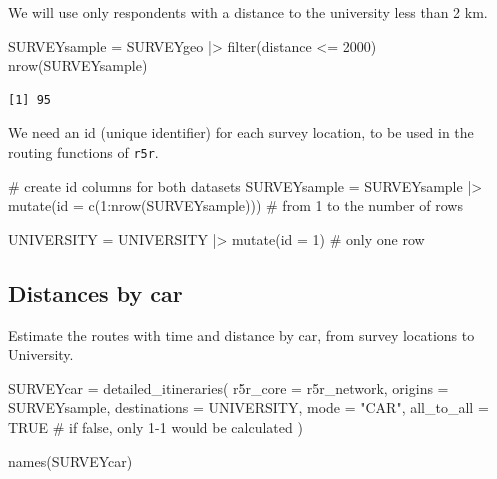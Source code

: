 \documentclass[
  letterpaper,
  DIV=11,
  numbers=noendperiod]{scrreprt}
\newenvironment{Shaded}{\begin{snugshade}}{\end{snugshade}}
\newcommand{\AttributeTok}[1]{\textcolor[rgb]{0.40,0.45,0.13}{#1}}
\newcommand{\CommentTok}[1]{\textcolor[rgb]{0.37,0.37,0.37}{#1}}
\newcommand{\ConstantTok}[1]{\textcolor[rgb]{0.56,0.35,0.01}{#1}}
\newcommand{\DecValTok}[1]{\textcolor[rgb]{0.68,0.00,0.00}{#1}}
\newcommand{\FunctionTok}[1]{\textcolor[rgb]{0.28,0.35,0.67}{#1}}
\newcommand{\NormalTok}[1]{\textcolor[rgb]{0.00,0.23,0.31}{#1}}
\newcommand{\OtherTok}[1]{\textcolor[rgb]{0.00,0.23,0.31}{#1}}
\newcommand{\SpecialCharTok}[1]{\textcolor[rgb]{0.37,0.37,0.37}{#1}}
\newcommand{\StringTok}[1]{\textcolor[rgb]{0.13,0.47,0.30}{#1}}
\begin{document}
We will use only respondents with a distance to the university less than
2 km.

\begin{Shaded}
\begin{Highlighting}[]
\NormalTok{SURVEYsample }\OtherTok{=}\NormalTok{ SURVEYgeo }\SpecialCharTok{|\textgreater{}} \FunctionTok{filter}\NormalTok{(distance }\SpecialCharTok{\textless{}=} \DecValTok{2000}\NormalTok{)}
\FunctionTok{nrow}\NormalTok{(SURVEYsample)}
\end{Highlighting}
\end{Shaded}

\begin{verbatim}
[1] 95
\end{verbatim}

We need an id (unique identifier) for each survey location, to be used
in the routing functions of \texttt{r5r}.

\begin{Shaded}
\begin{Highlighting}[]
\CommentTok{\# create id columns for both datasets}
\NormalTok{SURVEYsample }\OtherTok{=}\NormalTok{ SURVEYsample }\SpecialCharTok{|\textgreater{}} 
  \FunctionTok{mutate}\NormalTok{(}\AttributeTok{id =} \FunctionTok{c}\NormalTok{(}\DecValTok{1}\SpecialCharTok{:}\FunctionTok{nrow}\NormalTok{(SURVEYsample))) }\CommentTok{\# from 1 to the number of rows}

\NormalTok{UNIVERSITY }\OtherTok{=}\NormalTok{ UNIVERSITY }\SpecialCharTok{|\textgreater{}} 
  \FunctionTok{mutate}\NormalTok{(}\AttributeTok{id =} \DecValTok{1}\NormalTok{) }\CommentTok{\# only one row}
\end{Highlighting}
\end{Shaded}

\subsection{Distances by car}\label{distances-by-car}

Estimate the routes with time and distance by car, from survey locations
to University.

\begin{Shaded}
\begin{Highlighting}[]
\NormalTok{SURVEYcar }\OtherTok{=} \FunctionTok{detailed\_itineraries}\NormalTok{(}
  \AttributeTok{r5r\_core =}\NormalTok{ r5r\_network,}
  \AttributeTok{origins =}\NormalTok{ SURVEYsample,}
  \AttributeTok{destinations =}\NormalTok{ UNIVERSITY,}
  \AttributeTok{mode =} \StringTok{"CAR"}\NormalTok{,}
  \AttributeTok{all\_to\_all =} \ConstantTok{TRUE} \CommentTok{\# if false, only 1{-}1 would be calculated}
\NormalTok{)}

\FunctionTok{names}\NormalTok{(SURVEYcar)}
\end{Highlighting}
\end{Shaded}
\end{document}
